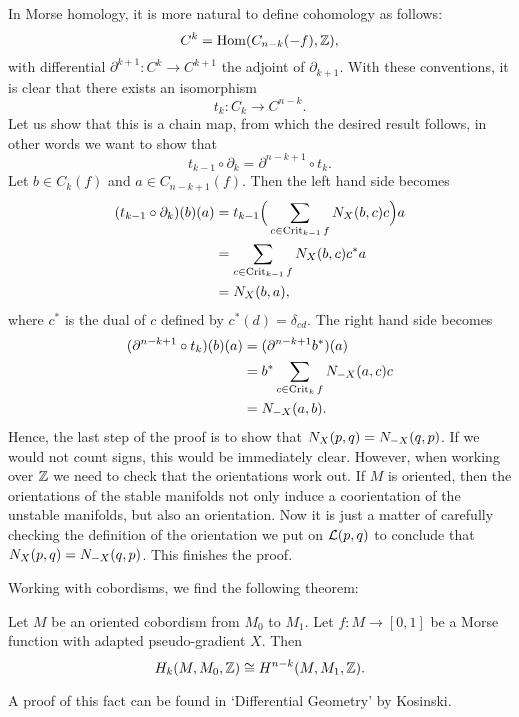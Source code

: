 \begin{myproof}
    In Morse homology, it is more natural to define cohomology as follows:
    \[
        C^{k} = \operatorname{Hom}(C_{n-k}(-f), \mathbb{Z})
    ,\]
    with differential $\partial^{k+1}:C^{k} \to  C^{k+1}$ the adjoint of $\partial_{k+1}$.
    With these conventions, it is clear that there exists an isomorphism
    \[
    t_k: C_k \to  C^{n-k}
    .\] 
    Let us show that this is a chain map, from which the desired result follows, in other words we want to show that
    \[
    t_{k-1}  \circ  \partial_k = \partial^{n-k+1}  \circ  t_k
    .\] 
    Let $b \in C_k(f)$ and $a \in C_{n-k+1}(f)$.
    Then the left hand side becomes
    \begin{align*}
        (t_{k-1}  \circ  \partial_k)(b)(a)
        &= t_{k-1}\Big(\sum_{c \in \operatorname{Crit}_{k-1}f} N_{X}(b, c) c\Big) a \\
        &= \sum_{c \in \operatorname{Crit}_{k-1}f} N_{X}(b, c) c^{*} a\\
        &= N_{X}(b, a)
    ,\end{align*} 
    where $c^{*}$ is the dual of $c$ defined by $c^{*}(d) = \delta_{cd}$.
    The right hand side becomes
    \begin{align*}
        (\partial^{n-k+1}  \circ  t_k)(b)(a) &= (\partial^{n-k+1}  b^{*})(a)\\
                                          &= b^{*} \sum_{c \in \operatorname{Crit}_k f} N_{-X}(a, c) c\\
                                          &= N_{-X}(a, b)
    .\end{align*} 
    Hence, the last step of the proof is to show that $N_{X}(p, q) = N_{-X}(q, p)$.
    If we would not count signs, this would be immediately clear.
    However, when working over $\mathbb{Z}$ we need to check that the orientations work out.
    If $M$ is oriented, then the orientations of the stable manifolds not only induce a coorientation of the unstable manifolds, but also an orientation.
    Now it is just a matter of carefully checking the definition of the orientation we put on $\mathcal L(p, q)$ to conclude that $N_{X}(p, q) = N_{-X}(q, p)$.
    This finishes the proof.
\end{myproof}

Working with cobordisms, we find the following theorem:
\begin{theorem}
    Let $M$ be an oriented cobordism from  $M_0$ to $M_1$.
    Let $f: M \to  [0,1]$ be a Morse function with adapted pseudo-gradient $X$.
    Then
     \[
         H_k(M, M_0, \mathbb{Z}) \cong H^{n-k}(M, M_1, \mathbb{Z})
    .\] 
\end{theorem}
A proof of this fact can be found in `Differential Geometry' by Kosinski.

